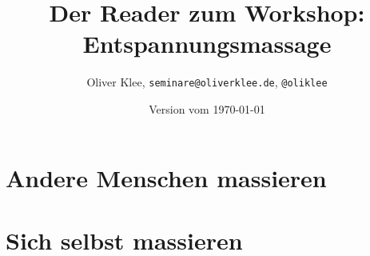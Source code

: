 \documentclass[a4paper,twoside,11pt,titlepage,openany]{scrbook}
\author{Oliver Klee, \texttt{seminare@oliverklee.de}, \texttt{@oliklee}}
\title{Der Reader zum Workshop: Entspannungsmassage}
\date{Version vom \today}
\begin{document}
\nocite*{}

\maketitle
\frontmatter



\tableofcontents

\mainmatter



\chapter{Andere Menschen massieren}






\chapter{Sich selbst massieren}


\backmatter

\end{document}
